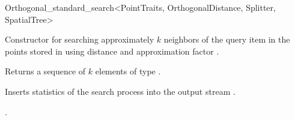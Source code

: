 \begin{ccRefClass}{Orthogonal_standard_search<PointTraits, OrthogonalDistance, Splitter, SpatialTree>}
\ccOperations

\def\ccLongParamLayout{\ccTrue}
{Constructor for searching approximately $k$ neighbors of the query item  
in the points stored in  using 
distance  and approximation factor .}

{Returns a sequence of $k$ elements of type }.


\begin{ccAdvanced}
{
Inserts statistics of the search process into the output stream .
}
\end{ccAdvanced}

\ccSeeAlso

.

\end{ccRefClass}


